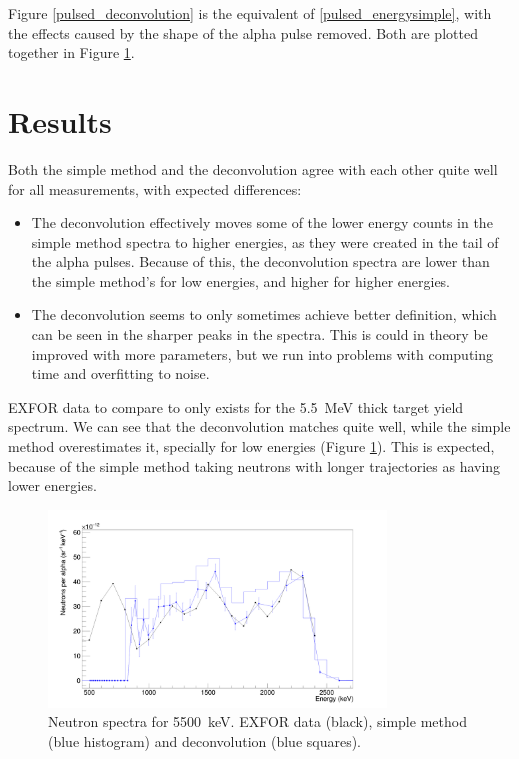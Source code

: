\documentclass[a4paper,12pt]{report}
\begin{document}
Figure \ref{pulsed_deconvolution} is the equivalent of \ref{pulsed_energysimple}, with the effects caused by the shape of the alpha pulse removed.
Both are plotted together in Figure \ref{pulsed_5mev}.

\section{Results}
Both the simple method and the deconvolution agree with each other quite well for all measurements, with expected differences:
\begin{itemize}
	\item The deconvolution effectively moves some of the lower energy counts in the simple method spectra to higher energies, as they were created in the tail of the alpha pulses.
		Because of this, the deconvolution spectra are lower than the simple method's for low energies, and higher for higher energies.
	\item The deconvolution seems to only sometimes achieve better definition, which can be seen in the sharper peaks in the spectra.
		This is could in theory be improved with more parameters, but we run into problems with computing time and overfitting to noise.
\end{itemize}

EXFOR data to compare to only exists for the \qty{5.5}{\MeV} thick target yield spectrum.
We can see that the deconvolution matches quite well, while the simple method overestimates it, specially for low energies (Figure \ref{pulsed_5mev}).
This is expected, because of the simple method taking neutrons with longer trajectories as having lower energies.

\begin{figure}[H]
	\centering
	\includegraphics[width=0.80\textwidth]{pulsed_5mev.png}
	\caption{Neutron spectra for \qty{5500}{\keV}.
	EXFOR data (black), simple method (blue histogram) and deconvolution (blue squares).}
	\label{pulsed_5mev}
\end{figure}
\end{document}
